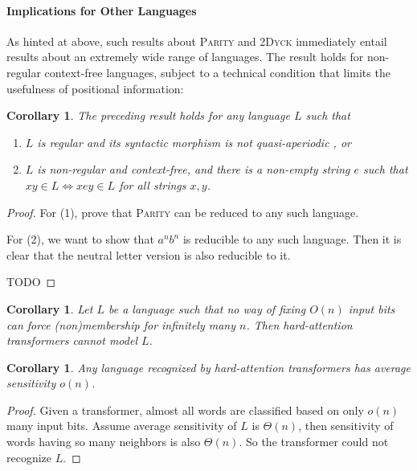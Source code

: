 \documentclass[11pt,a4paper]{article}
\newcounter{theorem}
\newtheorem{corollary}[theorem]{Corollary}
\begin{document}
\paragraph{Implications for Other Languages}
As hinted at above, such results about \textsc{Parity} and \textsc{2Dyck} immediately entail results about an extremely wide range of languages.
The result holds for non-regular context-free languages, subject to a technical condition that limits the usefulness of positional information:
\begin{corollary}
The preceding result holds for any language $L$ such that
\begin{enumerate}
    \item $L$ is regular and its syntactic morphism is not quasi-aperiodic \citep[p. 488]{barrington1992regular}, or
\item $L$ is non-regular and context-free, and there is a non-empty string $e$ such that $xy \in L \Leftrightarrow xey \in L$ for all strings $x,y$.
\end{enumerate}
\end{corollary}
\begin{proof}
For (1), \cite[p. 488]{barrington1992regular} prove that \textsc{Parity} can be reduced to any such language.

For (2), we want to show that $a^nb^n$ is reducible to any such language. Then it is clear that the neutral letter version is also reducible to it.

TODO


\end{proof}


\begin{corollary}
Let $L$ be a language such that no way of fixing $O(n)$ input bits can force (non)membership for infinitely many $n$. Then hard-attention transformers cannot model $L$.
\end{corollary}

\begin{corollary}
Any language recognized by hard-attention transformers has average sensitivity $o(n)$.
\end{corollary}

\begin{proof}
Given a transformer, almost all words are classified based on only $o(n)$ many input bits.
Assume average sensitivity of $L$ is $\Theta(n)$, then sensitivity of words having so many neighbors is also $\Theta(n)$.
So the transformer could not recognize $L$.
\end{proof}
\end{document}
